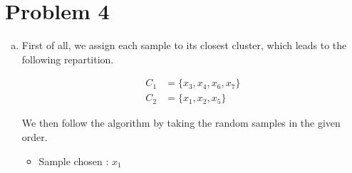 \documentclass[a4paper, 10pt, twoside]{article}
\begin{document}
\section*{Problem 4}
\begin{enumerate}[a)]
	\item First of all, we assign each sample to its closest cluster, which leads to the following repartition.

	      \begin{align*}
		      C_1 & = \{ x_3, x_4, x_6, x_7\} \\
		      C_2 & = \{ x_1, x_2, x_5 \}
	      \end{align*}

	      We then follow the algorithm by taking the random samples in the given order.

	      \begin{itemize}
		      \item Sample chosen : $x_1$

	      \end{itemize}

\end{enumerate}
\end{document}
